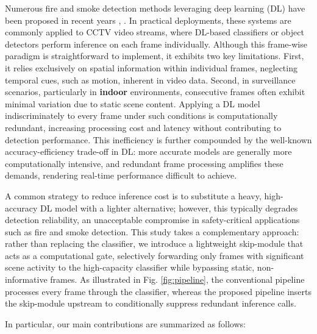 \documentclass[
  10pt,
]{article}
\begin{document}
Numerous fire and smoke detection methods leveraging deep learning (DL)
have been proposed in recent years
,
. In practical deployments,
these systems are commonly applied to CCTV video streams, where DL-based
classifiers or object detectors perform inference on each frame
individually. Although this frame-wise paradigm is straightforward to
implement, it exhibits two key limitations. First, it relies exclusively
on spatial information within individual frames, neglecting temporal
cues, such as motion, inherent in video data. Second, in surveillance
scenarios, particularly in \textbf{indoor} environments, consecutive
frames often exhibit minimal variation due to static scene content.
Applying a DL model indiscriminately to every frame under such
conditions is computationally redundant, increasing processing cost and
latency without contributing to detection performance. This inefficiency
is further compounded by the well-known accuracy-efficiency trade-off in
DL: more accurate models are generally more computationally intensive,
and redundant frame processing amplifies these demands, rendering
real-time performance difficult to achieve.

A common strategy to reduce inference cost is to substitute a heavy,
high-accuracy DL model with a lighter alternative; however, this
typically degrades detection reliability, an unacceptable compromise in
safety-critical applications such as fire and smoke detection. This
study takes a complementary approach: rather than replacing the
classifier, we introduce a lightweight skip-module that acts as a
computational gate, selectively forwarding only frames with significant
scene activity to the high-capacity classifier while bypassing static,
non-informative frames. As illustrated in Fig. \ref{fig:pipeline}, the
conventional pipeline processes every frame through the classifier,
whereas the proposed pipeline inserts the skip-module upstream to
conditionally suppress redundant inference calls.

In particular, our main contributions are summarized as follows:
\end{document}
